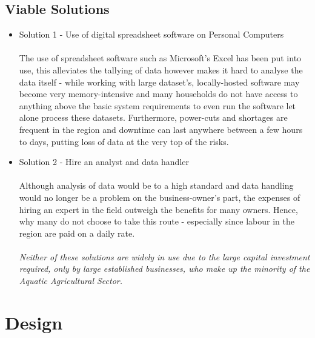 \documentclass[a4paper,11pt]{proc}
\begin{document}
\subsection{Viable Solutions}

\begin{itemize}
      \item Solution 1 - Use of digital spreadsheet software on Personal Computers\\
      \\The use of spreadsheet software such as Microsoft's Excel has been put into use, this alleviates the tallying of data however makes it hard to analyse the data itself - while working with large dataset's, locally-hosted software may become very memory-intensive and many households do not have access to anything above the basic system requirements to even run the software let alone process these datasets. Furthermore, power-cuts and shortages are frequent in the region and downtime can last anywhere between a few hours to days, putting loss of data at the very top of the risks.
      \item Solution 2 - Hire an analyst and data handler\\
      \\Although analysis of data would be to a high standard and data handling would no longer be a problem on the business-owner's part, the expenses of hiring an expert in the field outweigh the benefits for many owners. Hence, why many do not choose to take this route - especially since labour  in the region are paid on a daily rate.\\
      \\\textit{Neither of these solutions are widely in use due to the large capital investment required, only by large established businesses, who make up the minority of the Aquatic Agricultural Sector.}
\end{itemize}

\section{Design}
\end{document}
